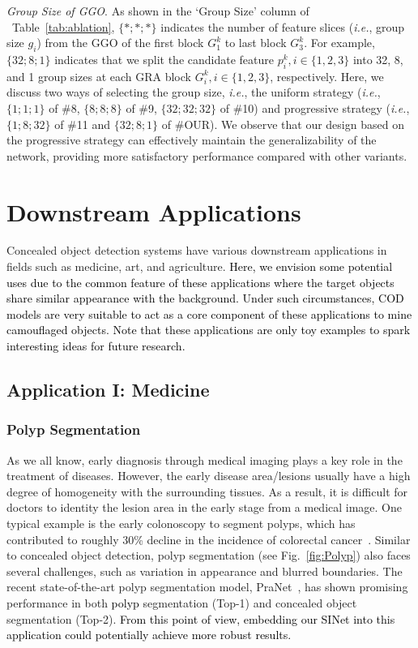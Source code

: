 \documentclass[10pt,journal,compsoc]{IEEEtran}
\def\ie{\emph{i.e.}}
\newcommand{\figref}[1]{Fig.~\ref{#1}}
\newcommand{\tabref}[1]{Table~\ref{#1}}
\newcommand{\Rev}[1]{\textcolor{black}{#1}}
\begin{document}
\textit{Group Size of GGO}.
%
As shown in the `Group Size' column of ~\tabref{tab:ablation}, 
$\{*;*;*\}$ indicates the number of feature slices (\ie, group size $g_i$) 
from the GGO of the first block $G^k_1$ to last block $G^k_3$.
%
For example, $\{ 32;8;1 \}$ indicates that we split the candidate feature 
$p^k_i, i \in \{ 1,2,3 \}$ into 32, 8, and 1 group sizes at each GRA block 
$G^k_i, i \in \{ 1,2,3 \}$, respectively. 
%
Here, we discuss two ways of selecting the group size, \ie, 
the uniform strategy (\ie, $\{1;1;1\}$ of \#8, $\{8;8;8\}$ of \#9, 
$\{32;32;32\}$ of \#10) and progressive strategy (\ie, $\{1;8;32\}$ of \#11 
and $\{32;8;1\}$ of \#OUR).
%
We observe that our design based on the progressive strategy can effectively 
maintain the generalizability of the network, 
providing more satisfactory performance compared with other variants.

\section{Downstream Applications}\label{sec:Applications}
Concealed object detection systems have various downstream applications 
in fields such as medicine, art, and agriculture. 
\Rev{Here, we envision some potential uses due to the common feature 
of these applications where the target objects share similar appearance 
with the background. 
Under such circumstances, COD models are very suitable to act as 
a core component of these applications to mine camouflaged objects.
Note that these applications are only toy examples to spark 
interesting ideas for future research.} 

\subsection{Application I: Medicine}

\subsubsection{Polyp Segmentation} 
As we all know, early diagnosis through medical imaging plays a key role in 
the treatment of diseases. 
However, the early disease area/lesions usually have a high degree of 
homogeneity with the surrounding tissues. 
As a result, it is difficult for doctors to identity the lesion area in the 
early stage from a medical image. 
One typical example is the early colonoscopy to segment polyps, 
which has contributed to roughly 30\% decline in the incidence of 
colorectal cancer~\cite{fan2020pranet}. Similar to concealed object detection, 
polyp segmentation (see \figref{fig:Polyp}) also faces several challenges, 
such as variation in appearance and blurred boundaries. 
The recent state-of-the-art polyp segmentation model, 
PraNet~\cite{fan2020pranet}, has shown promising performance in 
both \Rev{polyp} segmentation (Top-1) and concealed object segmentation (Top-2). 
\Rev{From this point of view, embedding our SINet into this application 
could potentially achieve more robust results.}
\end{document}
